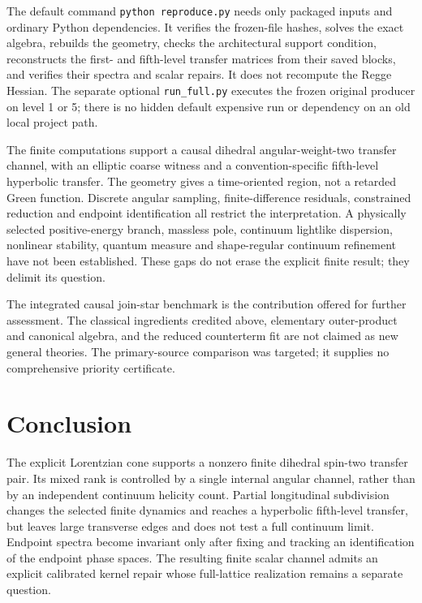 \documentclass[11pt]{article}
\theoremstyle{remark}\newtheorem{remark}[theorem]{Remark}
\begin{document}
The default command \texttt{python reproduce.py} needs only packaged inputs and ordinary Python dependencies.
It verifies the frozen-file hashes, solves the exact algebra, rebuilds the geometry, checks the architectural support condition, reconstructs the first- and fifth-level transfer matrices from their saved blocks, and verifies their spectra and scalar repairs.
It does not recompute the Regge Hessian.
The separate optional \texttt{run\_full.py} executes the frozen original producer on level 1 or 5; there is no hidden default expensive run or dependency on an old local project path.

The finite computations support a causal dihedral angular-weight-two transfer channel, with an elliptic coarse witness and a convention-specific fifth-level hyperbolic transfer.
The geometry gives a time-oriented region, not a retarded Green function.
Discrete angular sampling, finite-difference residuals, constrained reduction and endpoint identification all restrict the interpretation.
A physically selected positive-energy branch, massless pole, continuum lightlike dispersion, nonlinear stability, quantum measure and shape-regular continuum refinement have not been established.
These gaps do not erase the explicit finite result; they delimit its question.

The integrated causal join-star benchmark is the contribution offered for further assessment.
The classical ingredients credited above, elementary outer-product and canonical algebra, and the reduced counterterm fit are not claimed as new general theories.
The primary-source comparison was targeted; it supplies no comprehensive priority certificate.

\section{Conclusion}
The explicit Lorentzian cone supports a nonzero finite dihedral spin-two transfer pair.
Its mixed rank is controlled by a single internal angular channel, rather than by an independent continuum helicity count.
Partial longitudinal subdivision changes the selected finite dynamics and reaches a hyperbolic fifth-level transfer, but leaves large transverse edges and does not test a full continuum limit.
Endpoint spectra become invariant only after fixing and tracking an identification of the endpoint phase spaces.
The resulting finite scalar channel admits an explicit calibrated kernel repair whose full-lattice realization remains a separate question.
\end{document}
